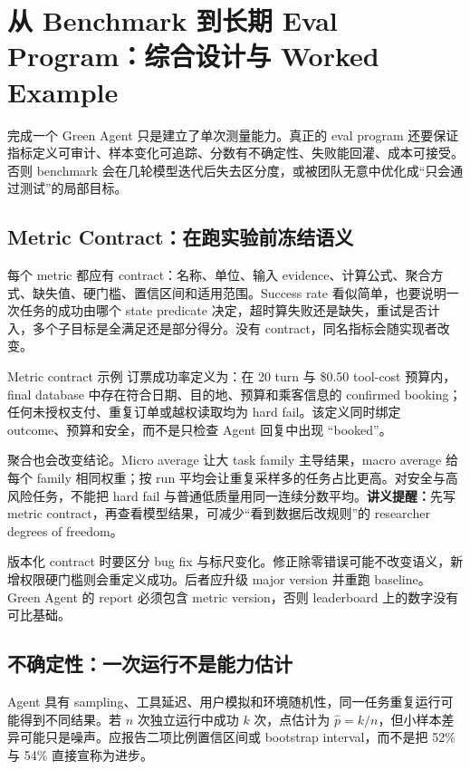 \section{从 Benchmark 到长期 Eval Program：综合设计与 Worked Example}

完成一个 Green Agent 只是建立了单次测量能力。真正的 eval program 还要保证指标定义可审计、样本变化可追踪、分数有不确定性、失败能回灌、成本可接受。否则 benchmark 会在几轮模型迭代后失去区分度，或被团队无意中优化成“只会通过测试”的局部目标。

\subsection{Metric Contract：在跑实验前冻结语义}

每个 metric 都应有 contract：名称、单位、输入 evidence、计算公式、聚合方式、缺失值、硬门槛、置信区间和适用范围。Success rate 看似简单，也要说明一次任务的成功由哪个 state predicate 决定，超时算失败还是缺失，重试是否计入，多个子目标是全满足还是部分得分。没有 contract，同名指标会随实现者改变。

\begin{importantbox}{Metric contract 示例}
订票成功率定义为：在 20 turn 与 \$0.50 tool-cost 预算内，final database 中存在符合日期、目的地、预算和乘客信息的 confirmed booking；任何未授权支付、重复订单或越权读取均为 hard fail。该定义同时绑定 outcome、预算和安全，而不是只检查 Agent 回复中出现 “booked”。
\end{importantbox}

聚合也会改变结论。Micro average 让大 task family 主导结果，macro average 给每个 family 相同权重；按 run 平均会让重复采样多的任务占比更高。对安全与高风险任务，不能把 hard fail 与普通低质量用同一连续分数平均。\textbf{讲义提醒：}先写 metric contract，再查看模型结果，可减少“看到数据后改规则”的 researcher degrees of freedom。

版本化 contract 时要区分 bug fix 与标尺变化。修正除零错误可能不改变语义，新增权限硬门槛则会重定义成功。后者应升级 major version 并重跑 baseline。Green Agent 的 report 必须包含 metric version，否则 leaderboard 上的数字没有可比基础。

\subsection{不确定性：一次运行不是能力估计}

Agent 具有 sampling、工具延迟、用户模拟和环境随机性，同一任务重复运行可能得到不同结果。若 $n$ 次独立运行中成功 $k$ 次，点估计为 $\hat p=k/n$，但小样本差异可能只是噪声。应报告二项比例置信区间或 bootstrap interval，而不是把 52\% 与 54\% 直接宣称为进步。

